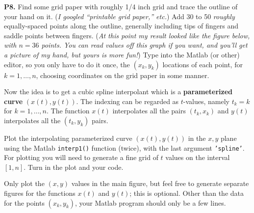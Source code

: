 \documentclass[12pt]{amsart}
\newcommand{\prob}[1]{\bigskip\noindent\textbf{#1.}\quad }
\begin{document}
\prob{P8}  Find some grid paper with roughly 1/4 inch grid and trace the outline of your hand on it.  (\emph{I googled ``printable grid paper,'' etc.})  Add 30 to 50 \emph{roughly} equally-spaced points along the outline, generally including tips of fingers and saddle points between fingers.  (\emph{At this point my result looked like the figure below, with $n=36$ points.  You can read values off this graph if you want, and you'll get a picture of \emph{my} hand, but yours is more fun!})  Type into the Matlab (or other) editor, so you only have to do it once, the $(x_k,y_k)$ locations of each point, for $k=1,\dots,n$, choosing coordinates on the grid paper in some manner.

Now the idea is to get a cubic spline interpolant which is a \textbf{parameterized curve} $(x(t),y(t))$.  The indexing can be regarded as $t$-values, namely $t_k=k$ for $k=1,\dots,n$.  The function $x(t)$ interpolates all the pairs $(t_k,x_k)$ and $y(t)$ interpolates all the $(t_k,y_k)$ pairs.

Plot the interpolating parameterized curve $(x(t),y(t))$ in the $x,y$ plane using the Matlab \texttt{interp1()} function (twice), with the last argument \texttt{'spline'}.  For plotting you will need to generate a fine grid of $t$ values on the interval $[1,n]$.  Turn in the plot and your code.

Only plot the $(x,y)$ values in the main figure, but feel free to generate separate figures for the functions $x(t)$ and $y(t)$; this is optional.  Other than the data for the points $(x_k,y_k)$, your Matlab program should only be a few lines.
\end{document}

